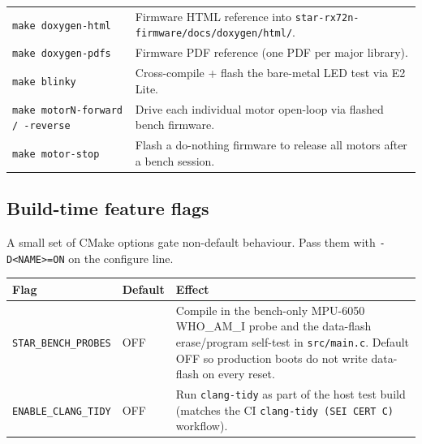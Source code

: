 \begin{center}
\begin{tabular}{|p{5.0cm}|p{9.5cm}|}
\texttt{make doxygen-html}              & Firmware HTML reference into \texttt{star-rx72n-firmware/docs/doxygen/html/}.                                        \\
\texttt{make doxygen-pdfs}              & Firmware PDF reference (one PDF per major library).                                                                  \\
\texttt{make blinky}                    & Cross-compile + flash the bare-metal LED test via E2 Lite.                                                          \\
\texttt{make motorN-forward / -reverse} & Drive each individual motor open-loop via flashed bench firmware.                                                   \\
\texttt{make motor-stop}                & Flash a do-nothing firmware to release all motors after a bench session.                                            \\
\hline
\end{tabular}
\end{center}

\subsection{Build-time feature flags}

A small set of CMake options gate non-default behaviour. Pass them with
\texttt{-D<NAME>=ON} on the configure line.

\begin{center}
\begin{tabular}{|p{5.0cm}|p{2.0cm}|p{7.5cm}|}
\hline
\textbf{Flag}                       & \textbf{Default} & \textbf{Effect}                                                                                                   \\
\hline
\texttt{STAR\_BENCH\_PROBES}        & OFF             & Compile in the bench-only MPU-6050 WHO\_AM\_I probe and the data-flash erase/program self-test in
                                                       \texttt{src/main.c}. Default OFF so production boots do not write data-flash on every reset.                                       \\
\texttt{ENABLE\_CLANG\_TIDY}        & OFF             & Run \texttt{clang-tidy} as part of the host test build (matches the CI \texttt{clang-tidy (SEI CERT C)} workflow).\\
\hline
\end{tabular}
\end{center}

